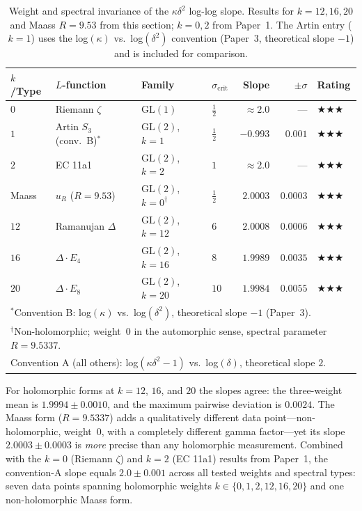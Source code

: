 \documentclass[11pt, a4paper]{article}
\theoremstyle{plain}
\theoremstyle{definition}
\begin{document}
\begin{table}[ht]
\centering
\caption{Weight and spectral invariance of the $\kappa\delta^{2}$ log-log slope.
  Results for $k=12,16,20$ and Maass $R=9.53$ from this section;
  $k=0,2$ from Paper~1.
  The Artin entry ($k=1$) uses the log$(\kappa)$ vs.\ log$(\delta^2)$
  convention (Paper~3, theoretical slope $-1$) and is included for comparison.}
\label{tab:weightuniv}
\small
\begin{tabular}{llllrrl}
\toprule
$k$/Type & $L$-function & Family & $\sigma_{\mathrm{crit}}$ & Slope & $\pm\sigma$ & Rating \\
\midrule
$0$  & Riemann $\zeta$ & $\mathrm{GL}(1)$ & $\tfrac{1}{2}$ & $\approx 2.0$ & --- & $\bigstar\bigstar\bigstar$ \\
$1$  & Artin $S_3$ (conv.\ B)$^{*}$ & $\mathrm{GL}(2)$, $k=1$ & $\tfrac{1}{2}$ & $-0.993$ & $0.001$ & $\bigstar\bigstar\bigstar$ \\
$2$  & EC 11a1 & $\mathrm{GL}(2)$, $k=2$ & $1$ & $\approx 2.0$ & --- & $\bigstar\bigstar\bigstar$ \\
Maass & $u_{R}$ ($R{=}9.53$) & $\mathrm{GL}(2)$, $k{=}0^{\dagger}$ & $\tfrac{1}{2}$ & $\mathbf{2.0003}$ & $\mathbf{0.0003}$ & $\bigstar\bigstar\bigstar$ \\
$12$ & Ramanujan $\Delta$ & $\mathrm{GL}(2)$, $k=12$ & $6$ & $2.0008$ & $0.0006$ & $\bigstar\bigstar\bigstar$ \\
$16$ & $\Delta\cdot E_4$ & $\mathrm{GL}(2)$, $k=16$ & $8$ & $1.9989$ & $0.0035$ & $\bigstar\bigstar\bigstar$ \\
$20$ & $\Delta\cdot E_8$ & $\mathrm{GL}(2)$, $k=20$ & $10$ & $1.9984$ & $0.0055$ & $\bigstar\bigstar\bigstar$ \\
\bottomrule
\multicolumn{7}{l}{\small $^{*}$Convention B: log$(\kappa)$ vs.\ log$(\delta^2)$, theoretical slope $-1$ (Paper~3).} \\
\multicolumn{7}{l}{\small $^{\dagger}$Non-holomorphic; weight~$0$ in the automorphic sense, spectral parameter $R=9.5337$.} \\
\multicolumn{7}{l}{\small Convention A (all others): log$(\kappa\delta^2-1)$ vs.\ log$(\delta)$, theoretical slope $2$.} \\
\end{tabular}
\end{table}

For holomorphic forms at $k=12$, $16$, and $20$ the slopes agree: the
three-weight mean is $1.9994\pm 0.0010$, and the maximum pairwise deviation
is $0.0024$.  The Maass form ($R=9.5337$) adds a qualitatively different
data point---non-holomorphic, weight~$0$, with a completely different gamma
factor---yet its slope $2.0003\pm 0.0003$ is \emph{more} precise than any
holomorphic measurement.  Combined with the $k=0$ (Riemann $\zeta$) and
$k=2$ (EC 11a1) results from Paper~1, the convention-A slope equals
$2.0\pm 0.001$ across all tested weights and spectral types: seven data
points spanning holomorphic weights $k\in\{0,1,2,12,16,20\}$ and one
non-holomorphic Maass form.
\end{document}
